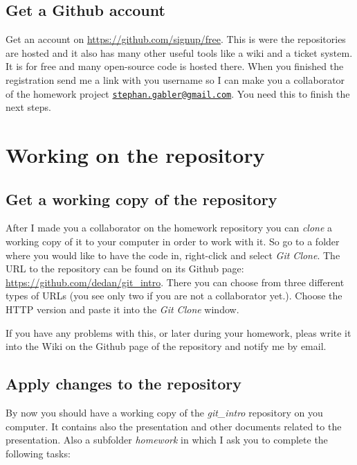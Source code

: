 \documentclass[]{article}
\begin{document}
\subsection{Get a Github account} %
\label{sg:sub:get_a_github_account}

Get an account on \url{https://github.com/signup/free}. This is were the repositories are hosted and it also has many other useful tools like a wiki and a ticket system. It is for free and many open-source code is hosted there. When you finished the registration send me a link with you username so I can make you a collaborator of the homework project \href{mailto:stephan.gabler@gmail.com}{\nolinkurl{stephan.gabler@gmail.com}}. You need this to finish the next steps.


\section{Working on the repository} %
\label{sg:sec:working_on_the_repository}

\subsection{Get a working copy of the repository} %
\label{sg:sub:get_a_working_copy_of_the_repository}

After I made you a collaborator on the homework repository you can \emph{clone} a working copy of it to your computer in order to work with it. So go to a folder where you would like to have the code in, right-click and select \emph{Git Clone}. The URL to the repository can be found on its Github page: \url{https://github.com/dedan/git_intro}. There you can choose from three different types of URLs (you see only two if you are not a collaborator yet.). Choose the HTTP version and paste it into the \emph{Git Clone} window.

If you have any problems with this, or later during your homework, pleas write it into the Wiki on the Github page of the repository and notify me by email.


\subsection{Apply changes to the repository} %
\label{sg:sub:apply_changes_to_the_repository}
By now you should have a working copy of the \emph{git\_intro} repository on you computer. It contains also the presentation and other documents related to the presentation. Also a subfolder \emph{homework} in which I ask you to complete the following tasks:
\end{document}

